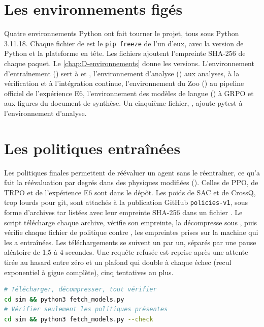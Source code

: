 \section{Les environnements figés}
\label{sec:envs}

Quatre environnements Python ont fait tourner le projet, tous sous Python 3.11.18. Chaque fichier de
 est le \texttt{pip freeze} de l'un d'eux, avec la version de
Python et la plateforme en tête. Les fichiers  ajoutent l'empreinte SHA-256 de chaque
paquet. Le \cref{chap:D-environnements} donne les versions. L'environnement d'entraînement
() sert à  et , l'environnement d'analyse
() aux analyses, à la vérification et à l'intégration continue, l'environnement
du Zoo () au pipeline officiel de l'expérience E6, l'environnement des modèles de
langue () à GRPO et aux figures du document de synthèse. Un cinquième fichier,
, ajoute pytest à l'environnement d'analyse.

\section{Les politiques entraînées}
\label{sec:release}

Les politiques finales permettent de réévaluer un agent sans le réentraîner, ce qu'a fait la
réévaluation par degrés dans des physiques modifiées (). Celles de PPO, de TRPO et de
l'expérience E6 sont dans le dépôt. Les poids de SAC et de CrossQ, trop lourds pour git, sont
attachés à la publication GitHub \texttt{policies-v1}, sous forme d'archives tar listées avec leur
empreinte SHA-256 dans un fichier . Le script 
télécharge chaque archive, vérifie son empreinte, la décompresse sous , puis vérifie
chaque fichier de politique contre , les empreintes prises
sur la machine qui les a entraînées. Les téléchargements se suivent un par un,
séparés par une pause aléatoire de 1,5 à 4 secondes. Une requête refusée est reprise après une
attente tirée au hasard entre zéro et un plafond qui double à chaque échec (recul exponentiel à gigue
complète), cinq tentatives au plus.

\begin{lstlisting}[language=bash,caption={Récupérer et vérifier les politiques de SAC et de CrossQ.},captionpos=b]
# Télécharger, décompresser, tout vérifier
cd sim && python3 fetch_models.py
# Vérifier seulement les politiques présentes
cd sim && python3 fetch_models.py --check
\end{lstlisting}

